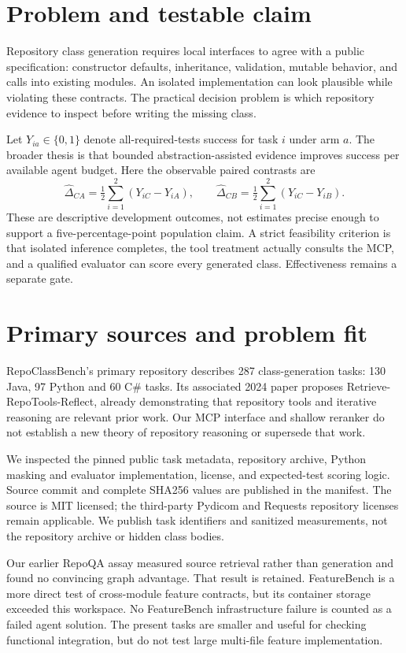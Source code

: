 \documentclass[11pt]{article}
\begin{document}
\section{Problem and testable claim}
Repository class generation requires local interfaces to agree with a public specification: constructor defaults, inheritance, validation, mutable behavior, and calls into existing modules. An isolated implementation can look plausible while violating these contracts. The practical decision problem is which repository evidence to inspect before writing the missing class.

Let $Y_{ia}\in\{0,1\}$ denote all-required-tests success for task $i$ under arm $a$. The broader thesis is that bounded abstraction-assisted evidence improves success per available agent budget. Here the observable paired contrasts are
\[\widehat\Delta_{CA}=\tfrac12\sum_{i=1}^2(Y_{iC}-Y_{iA}),\qquad
\widehat\Delta_{CB}=\tfrac12\sum_{i=1}^2(Y_{iC}-Y_{iB}).\]
These are descriptive development outcomes, not estimates precise enough to support a five-percentage-point population claim. A strict feasibility criterion is that isolated inference completes, the tool treatment actually consults the MCP, and a qualified evaluator can score every generated class. Effectiveness remains a separate gate.

\section{Primary sources and problem fit}
RepoClassBench's primary repository describes 287 class-generation tasks: 130 Java, 97 Python and 60 C\# tasks. Its associated 2024 paper proposes Retrieve-RepoTools-Reflect, already demonstrating that repository tools and iterative reasoning are relevant prior work\citep{rcb}. Our MCP interface and shallow reranker do not establish a new theory of repository reasoning or supersede that work.

We inspected the pinned public task metadata, repository archive, Python masking and evaluator implementation, license, and expected-test scoring logic. Source commit and complete SHA256 values are published in the manifest. The source is MIT licensed; the third-party Pydicom and Requests repository licenses remain applicable. We publish task identifiers and sanitized measurements, not the repository archive or hidden class bodies.

Our earlier RepoQA assay measured source retrieval rather than generation and found no convincing graph advantage\citep{oodretrieval}. That result is retained. FeatureBench is a more direct test of cross-module feature contracts, but its container storage exceeded this workspace. No FeatureBench infrastructure failure is counted as a failed agent solution. The present tasks are smaller and useful for checking functional integration, but do not test large multi-file feature implementation.
\end{document}
